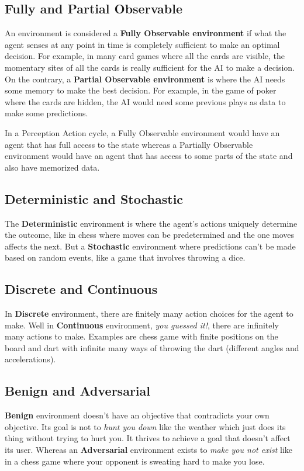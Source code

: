 \documentclass[12pt]{article}
\begin{document}
\subsection*{Fully and Partial Observable}
An environment is considered a \textbf{Fully Observable environment} if what the agent senses at any point in time is completely sufficient to make an optimal decision. For example, in many card games where all the cards are visible, the momentary sites of all the cards is really sufficient for the AI to make a decision. On the contrary, a \textbf{Partial Observable environment} is where the AI needs some memory to make the best decision. For example, in the game of poker where the cards are hidden, the AI would need some previous plays as data to make some predictions. \par
In a Perception Action cycle, a Fully Observable environment would have an agent that has full access to the state whereas a Partially Observable environment would have an agent that has access to some parts of the state and also have memorized data.
\subsection*{Deterministic and Stochastic}
The \textbf{Deterministic} environment is where the agent's actions uniquely determine the outcome, like in chess where moves can be predetermined and the one moves affects the next. But a \textbf{Stochastic} environment where predictions can't be made based on random events, like a game that involves throwing a dice.
\subsection*{Discrete and Continuous}
In \textbf{Discrete} environment, there are finitely many action choices for the agent to make. Well in \textbf{Continuous} environment, \textit{you guessed it!}, there are infinitely many actions to make. Examples are chess game with finite positions on the board and dart with infinite many ways of throwing the dart (different angles and accelerations).
\subsection*{Benign and Adversarial}
\textbf{Benign} environment doesn't have an objective that contradicts your own objective. Its goal is not to \textit{hunt you down} like the weather which just does its thing without trying to hurt you. It thrives to achieve a goal that doesn't affect its user. Whereas an \textbf{Adversarial} environment exists to \textit{make you not exist} like in a chess game where your opponent is sweating hard to make you lose.
\end{document}
